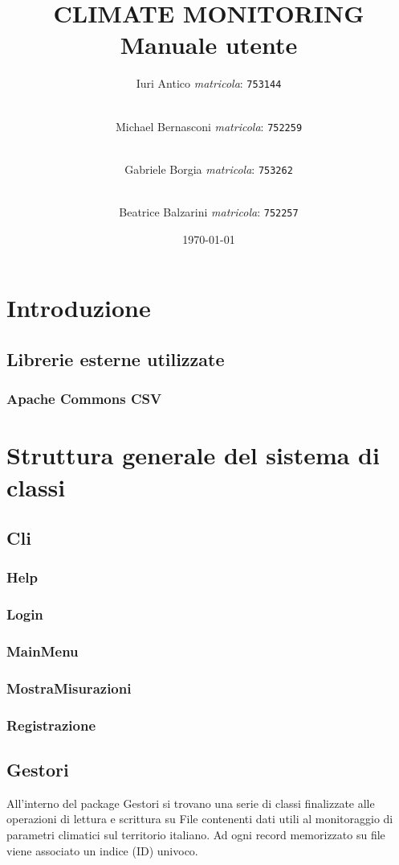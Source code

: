 \documentclass[a4paper, 12pt,twoside]{article}
\title {
	CLIMATE MONITORING \\
	{Manuale utente}}
\author{
	Iuri Antico \textit{matricola}:
	\texttt{753144}
	\and \\
	Michael Bernasconi \textit{matricola}:
	\texttt{752259}
	\and \\
	Gabriele Borgia \textit{matricola}:
	\texttt{753262}
	\and \\
	Beatrice Balzarini \textit{matricola}:
	\texttt{752257}
}
\date{\today}
\begin{document}
	
	\makeatletter
	\begin{titlepage}
		\maketitle
	\end{titlepage}
	\makeatother

	\tableofcontents

	\newpage
	
	\section{Introduzione}
		\subsection{Librerie esterne utilizzate}
		
			\subsubsection{Apache Commons CSV}
			
	\section{Struttura generale del sistema di classi}
		\subsection{Cli}
			\subsubsection{Help}
			\subsubsection{Login}
			\subsubsection{MainMenu}
			\subsubsection{MostraMisurazioni}
			\subsubsection{Registrazione}

		
		
		\subsection{Gestori}
		All'interno del package Gestori si trovano una serie di classi finalizzate alle operazioni di lettura e scrittura su File contenenti dati utili al monitoraggio di parametri climatici sul territorio italiano.
		Ad ogni record memorizzato su file viene associato un indice (ID) univoco.
				
\end{document}
